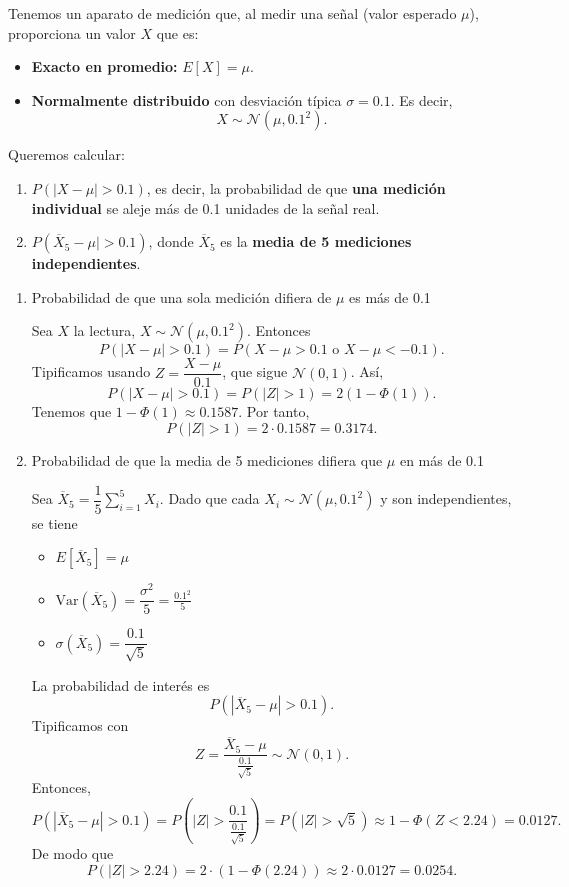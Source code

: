 \begin{enumerate}[label=\color{red}\textbf{\arabic*)}]
    Tenemos un aparato de medición que, al medir una señal (valor esperado $\mu$), proporciona un valor $X$ que es:
    \begin{itemize}[label=\textbullet]
        \item \textbf{Exacto en promedio:} $E[X]=\mu$.
        \item \textbf{Normalmente distribuido} con desviación típica $\sigma=0.1$. Es decir, \[
        X\sim \mathcal{N}(\mu,0.1^2).
        \]  
    \end{itemize}
        Queremos calcular: 
        \begin{enumerate}[label=\arabic*)]
            \item $P(|X-\mu|> 0.1)$, es decir, la probabilidad de que \textbf{una medición individual} se aleje más de 0.1 unidades de la señal real.
            \item $P(\overline{X}_5-\mu| >0.1)$, donde $\overline{X}_5$ es la \textbf{media de 5 mediciones independientes}. 
        \end{enumerate}
        \begin{enumerate}[label=\arabic*), leftmargin=*]
            \item Probabilidad de que una sola medición difiera de $\mu$ es más de 0.1

                Sea $X$ la lectura, $X\sim \mathcal{N}(\mu,0.1^2)$. Entonces \[
                P(|X-\mu| >0.1)=P(X-\mu>0.1\text{ o }X-\mu<-0.1).
                \] 
                Tipificamos usando $Z=\dfrac{X-\mu}{0.1}$, que sigue $\mathcal{N}(0,1)$. Así, \[
                P(|X-\mu| >0.1)=P(|Z| >1)=2(1-\Phi(1)).
                \] 
                Tenemos que $1-\Phi(1)\approx 0.1587$. Por tanto, \[
                P(|Z|>1)=2\cdot 0.1587=0.3174.
                \] 
            \item Probabilidad de que la media de 5 mediciones difiera que $\mu$ en más de 0.1

                Sea $\overline{X}_5=\dfrac{1}{5}\sum_{i=1}^{5} X_i$. Dado que cada $X_i\sim \mathcal{N}(\mu,0.1^2)$ y son independientes, se tiene
                \begin{itemize}[label=\textbullet]
                    \item $E[\overline{X}_5]=\mu$
                    \item $\mathrm{Var}(\overline{X}_5)=\dfrac{\sigma^2}{5}=\frac{0.1^2}{5}$
                    \item $\sigma(\overline{X}_5)=\dfrac{0.1}{\sqrt{5} }$
                \end{itemize}
                La probabilidad de interés es \[
                P(|\overline{X}_5-\mu| >0.1).
                \] 
                Tipificamos con \[
                Z=\dfrac{\overline{X}_5-\mu}{\frac{0.1}{\sqrt{5} } }\sim \mathcal{N}(0,1).
                \] 
                Entonces, \[
                P(|\overline{X}_5-\mu| >0.1)=P\left( |Z| > \frac{0.1}{\frac{0.1}{\sqrt{5} } } \right) =P(|Z|>\sqrt{5} )\approx 1 - \Phi(Z<2.24)=0.0127.
                \] 
                De modo que \[
                P(|Z| >2.24)=2\cdot (1-\Phi(2.24))\approx 2\cdot 0.0127=0.0254.
                \] 
                

\end{enumerate}
\end{enumerate}

